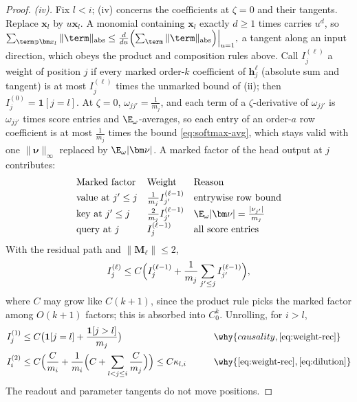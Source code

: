 \begin{proof}
\emph{(iv).} Fix $l<i$; (iv) concerns the coefficients at $\zeta=0$ and their tangents. Replace $\bm x_l$ by $u\bm x_l$. A monomial containing $\bm x_l$
exactly $d\ge1$ times carries $u^d$, so
 $\sum_{\term\ni\bm x_l}\|\term\|_{\mathrm{abs}}\le\frac{d}{du}\Bigl(\sum_{\term}\|\term\|_{\mathrm{abs}}\Bigr)\Big|_{u=1},$ 
a tangent along an input direction, which obeys the product and composition rules above. Call $I^{(\ell)}_j$ a weight of position $j$ if every
marked order-$k$ coefficient of $\bm h^\ell_j$ (absolute sum and tangent) is at most $I^{(\ell)}_j$ times the unmarked bound of (ii); then
$I^{(0)}_j=\mathbf 1[j=l]$. At $\zeta=0$, $\omega_{jj'}=\frac{1}{m_j}$, and each term of a $\zeta$-derivative of $\omega_{jj'}$ is $\omega_{jj'}$ times score entries and
$\E_\omega$-averages, so each entry of an order-$a$ row coefficient is at most $\frac{1}{m_j}$ times the bound \cref{eq:softmax-avg}, which stays
valid with one $\|\bm\nu\|_\infty$ replaced by $\E_\omega|\bm\nu|$. A marked factor of the head output at $j$ contributes:
\[
\begin{array}{@{}lll@{}}
 \text{Marked factor} & \text{Weight} & \text{Reason}\\[2pt]
 \text{value at }j'\le j & \frac{1}{m_j}I^{(\ell-1)}_{j'} & \text{entrywise row bound}\\[2pt]
 \text{key at }j'\le j & \frac{2}{m_j}I^{(\ell-1)}_{j'} & \E_\omega|\bm\nu|=\frac{|\nu_{j'}|}{m_j}\\[2pt]
 \text{query at }j & I^{(\ell-1)}_j & \text{all score entries}
\end{array}
\]
With the residual path and $\|\mathbf M_\ell\|\le2$,
\begin{equation}
 I^{(\ell)}_j\le C\Bigl(I^{(\ell-1)}_j+\frac{1}{m_j}\sum_{j'\le j}I^{(\ell-1)}_{j'}\Bigr),
 \label{eq:weight-rec}
\end{equation}
where $C$ may grow like $C(k+1)$, since the product rule picks the marked factor among $O(k+1)$ factors; this is absorbed into $C_0^k$.
Unrolling, for $i>l$,
\begin{alignat*}{2}
 I^{(1)}_j&\le C\bigl(\mathbf 1[j=l]+\frac{\mathbf 1[j>l]}{m_j}\bigr) &\qquad& \why{causality, \cref{eq:weight-rec}}\\
 I^{(2)}_i&\le C\Bigl(\frac{C}{m_i}+\frac{1}{m_i}\Bigl(C+\sum_{l<j\le i}\frac{C}{m_j}\Bigr)\Bigr)\le C\kappa_{l,i} && \why{\cref{eq:weight-rec}, \cref{eq:dilution}}
\end{alignat*}
The readout and parameter tangents do not move positions.
\end{proof}

